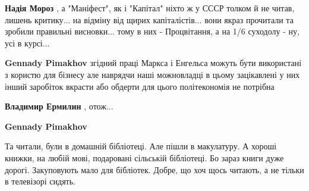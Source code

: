  
 
 
 
 

\begin{itemize}
 
\textbf{Надія Мороз} , а "Маніфест", як і "Капітал" ніхто ж у СССР толком й не читав, лишень критику... на відміну від щирих капіталістів... вони якраз прочитали та зробили правильні висновки... тому в них - Процвітання, а на 1/6 суходолу - ну, усі в курсі...

 
\textbf{Gennady Pimakhov} згідний праці Маркса і Енгельса можуть бути використані з користю для бізнесу але наврядчи наші можновладці в цьому зацікавлені у них інший заробіток вкрасти або обдерти для цього політекономія не потрібна

 
\textbf{Владимир Ермилин} , отож...

 
\textbf{Gennady Pimakhov} 

Та читали, були в домашній бібліотеці. Але пішли в макулатуру. А хороші книжки, на
любій мові, подаровані сільській бібліотеці. Бо зараз книги дуже
дорогі. Закуповують мало для бібліотек. Добре, що хоч щось читають, а не тільки в
телевізорі сидять.


\end{itemize}
